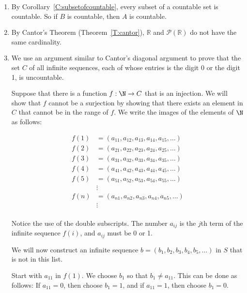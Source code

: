 \begin{enumerate}
\item By Corollary~\ref{C:subsetofcountable}, every subset of a countable set is countable.  So if 
$B$ is countable, then $A$ is countable.

\item By Cantor's Theorem (Theorem~\ref{T:cantor}), $\mathbb{R}$ and 
$\mathcal{P} \left( \mathbb{R} \right)$ do not have the same cardinality.

\item We use an argument similar to Cantor's diagonal argument to prove that the set $C$   of all infinite sequences, each of whose entries is the digit 0 or the digit 1, is uncountable.

Suppose that there is a function $f: \N \to C$ that is an injection.  We will show that 
$f$ cannot be a surjection by showing that there exists an element in 
$C$ that cannot be in the range of $f$.  We write the images of the elements of 
$\N$ as follows:

\[
\begin{aligned}
f \left( 1 \right) &= \left(a_{1 1}, a_{1 2}, a_{1 3}, a_{1 4}, a_{1 5}, \ldots \right) \\
f \left( 2 \right) &= \left(a_{2 1}, a_{2 2}, a_{2 3}, a_{2 4}, a_{2 5}, \ldots \right) \\
f \left( 3 \right) &= \left(a_{3 1}, a_{3 2}, a_{3 3}, a_{3 4}, a_{3 5}, \ldots \right) \\
f \left( 4 \right) &= \left(a_{4 1}, a_{4 2}, a_{4 3}, a_{4 4}, a_{4 5}, \ldots \right) \\
f \left( 5 \right) &= \left(a_{5 1}, a_{5 2}, a_{5 3}, a_{5 4}, a_{5 5}, \ldots \right) \\
                   & \vdots \\
f \left( n \right) &= \left(a_{n 1}, a_{n 2}, a_{n 3}, a_{n 4}, a_{n 5}, \ldots \right) \\
                   & \vdots \\
\end{aligned}
\]

Notice the use of the double subscripts. The number $a_{i j}$ is the $j${th} term of the infinite sequence $f \left( i \right)$, and $a_{i j}$ must be 0 or 1.

We will now construct an infinite sequence $b = \left(b_1, b_2, b_3, b_4, b_5, \ldots \right)$ in $S$ that is not in this list.  

Start with $a_{1 1}$ in $f \left( 1 \right)$.  We choose $b_1$ so that $b_1 \ne a_{1 1}$.  This can be done as follows:  If $a_{1 1} = 0$, then choose $b_1 = 1$, and if $a_{1 1} = 1$, then choose $b_1 = 0$.


\end{enumerate}
